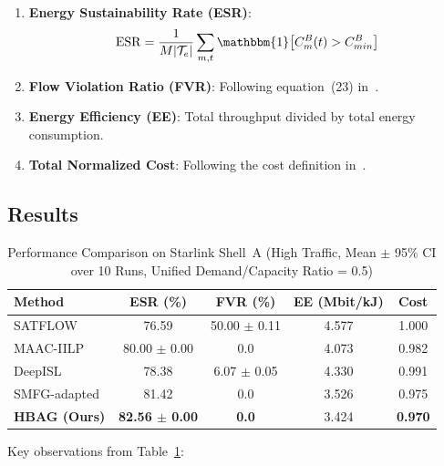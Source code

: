 \documentclass[journal]{IEEEtran}
\newcommand{\CB}{C^{B}}
\newcommand{\CBmin}{C^{B}_{min}}
\begin{document}
\begin{enumerate}
    \item \textbf{Energy Sustainability Rate (ESR)}:
    \begin{equation}
        \mathrm{ESR} =
        \frac{1}{M|\mathcal{T}_e|}
        \sum_{m,t}
        \mathbbm{1}\!\left[
        \CB_m(t) > \CBmin\right]
    \end{equation}
    \item \textbf{Flow Violation Ratio (FVR)}:
Following equation~(23) in~\cite{cen2024satflow}.
    \item \textbf{Energy Efficiency (EE)}:
Total throughput divided by total energy consumption.
    \item \textbf{Total Normalized Cost}:
Following the cost definition in~\cite{cen2024satflow}.
\end{enumerate}

\subsection{Results}

\begin{table}[t]
\centering
\caption{Performance Comparison on Starlink Shell~A
(High Traffic, Mean $\pm$ 95\% CI over 10 Runs,
Unified Demand/Capacity Ratio = 0.5)}
\label{tab:results}
\renewcommand{\arraystretch}{1.2}
\begin{tabular}{lcccc}
\toprule
\textbf{Method} & \textbf{ESR (\%)} &
\textbf{FVR (\%)} &
\textbf{EE (Mbit/kJ)} &
\textbf{Cost} \\
\midrule
SATFLOW~\cite{cen2024satflow}
    & 76.59 & 50.00 $\pm$ 0.11 & 4.577 & 1.000 \\
MAAC-IILP~\cite{li2023energy}
    & 80.00 $\pm$ 0.00 & 0.0 & 4.073 & 0.982 \\
DeepISL~\cite{li2023deepisl}
    & 78.38 & 6.07 $\pm$ 0.05 & 4.330 & 0.991 \\
SMFG-adapted~\cite{wang2023smfg}
    & 81.42 & 0.0 & 3.526 & 0.975 \\
\midrule
\textbf{HBAG (Ours)}
    & \textbf{82.56 $\pm$ 0.00}
    & \textbf{0.0}
    & 3.424
    & \textbf{0.970} \\
\bottomrule
\end{tabular}
\end{table}

Key observations from Table~\ref{tab:results}:
\end{document}
